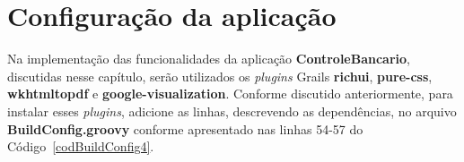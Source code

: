 \section{Configuração da aplicação} 

\vspace{0.5cm}

    Na   implementação   das
funcionalidades da aplicação  {\bf ControleBancario}, discutidas nesse capítulo,
serão  utilizados os  {\it plugins}  Grails {\bf  richui}, {\bf  pure-css}, {\bf
  wkhtmltopdf} e  {\bf google-visualization}. Conforme  discutido anteriormente,
para  instalar   esses  {\it  plugins},  adicione  as   linhas,  descrevendo  as
dependências,  no  arquivo  {\bf  BuildConfig.groovy} conforme  apresentado  nas
linhas 54-57 do Código~\ref{codBuildConfig4}.  

\newpage

